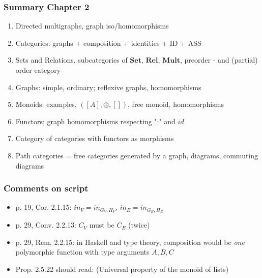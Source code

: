 \documentclass[handout]{beamer}
\newcommand{\bfsf}[1]{{\boldsymbol{#1}}}
\newcommand{\Set}{\bfsf{Set}}
\newcommand{\Rel}{\bfsf{Rel}}
\newcommand{\Mult}{\bfsf{Mult}}
\begin{document}
\frame
  {   
    \frametitle{Summary Chapter 2}\label{Ch2:Summary}

 \begin{enumerate}[<+->]
\item Directed multigraphs, graph iso/homomorphisms
\item Categories: graphs + composition + identities + ID + ASS
\item Sets and Relations, subcategories of $\Set$, $\Rel$, $\Mult$, preorder -
and (partial) order category
\item Graphs: simple, ordinary; reflexive graphs, homomorphisms
\item Monoids: examples, $([A],\oplus,[])$, free monoid, homomorphisms
\item Functors; graph homomorphisms respecting ";" and $id$
\item Category of categories with functors as morphisms
\item Path categories = free categories generated by a graph, diagrams,
commuting diagrams
 \end{enumerate}


}

\frame
  {   
    \frametitle{Comments on script}\label{Ch2:comments}

 \begin{itemize}[<+->]
\item p. 19, Cor. 2.1.15: $in_V = in_{G_V,H_V}$, $in_E = in_{G_E,H_E}$
\item p. 29, Conv. 2.2.13: $C_V$ must be $C_E$ (twice)
\item p. 29, Rem. 2.2.15: in Haskell and type theory, composition would be
\emph{one} polymorphic function with type arguments $A,B,C$
\item Prop. 2.5.22 should read: (Universal property of the monoid of lists) 
 \end{itemize}

 }
\end{document}
